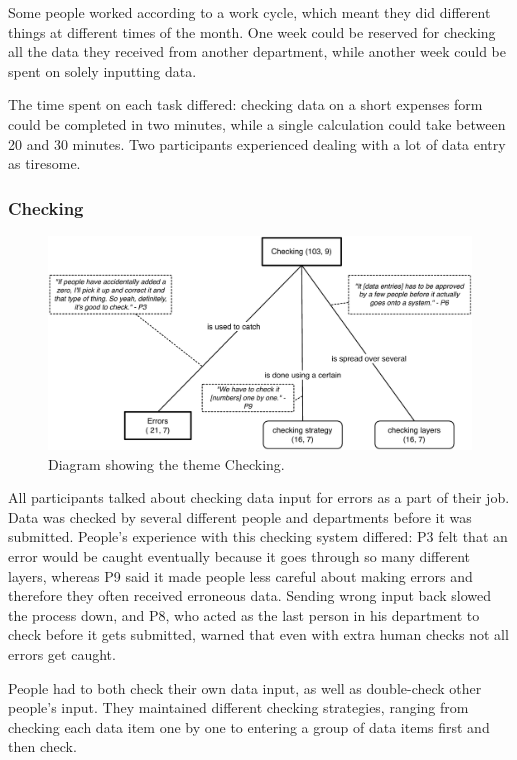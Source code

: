 \documentclass[11pt,oneside]{report}
\begin{document}
Some people worked according to a work cycle, which meant they did different things at different times of the month. One week could be reserved for checking all the data they received from another department, while another week could be spent on solely inputting data. 

The time spent on each task differed: checking data on a short expenses form could be completed in two minutes, while a single calculation could take between 20 and 30 minutes. Two participants experienced dealing with a lot of data entry as tiresome.

\pagebreak

\subsubsection{Checking}\label{subsec:Checking}
\begin{figure}[!ht]
\centering
\includegraphics[width=\textwidth]{images/Study1/Checking.pdf}
\caption{Diagram showing the theme Checking.}
\vspace{-9pt}
\label{fig:ch3_checking}
\end{figure}

All participants talked about checking data input for errors as a part of their job. Data was checked by several different people and departments before it was submitted. People's experience with this checking system differed: P3 felt that an error would be caught eventually because it goes through so many different layers, whereas P9 said it made people less careful about making errors and therefore they often received erroneous data. Sending wrong input back slowed the process down, and P8, who acted as the last person in his department to check before it gets submitted, warned that even with extra human checks not all errors get caught. 

People had to both check their own data input, as well as double-check other people's input. They maintained different checking strategies, ranging from checking each data item one by one to entering a group of data items first and then check. 
\end{document}
